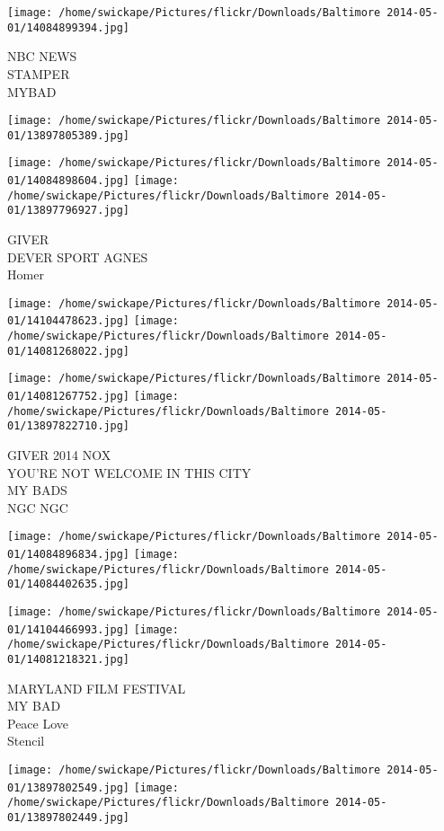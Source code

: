 \documentclass[10pt,letterpaper]{article}
\begin{document}
\texttt{[image: /home/swickape/Pictures/flickr/Downloads/Baltimore 2014-05-01/14084899394.jpg]}

NBC NEWS\\
STAMPER\\
MYBAD
\pagebreak

\texttt{[image: /home/swickape/Pictures/flickr/Downloads/Baltimore 2014-05-01/13897805389.jpg]}

\vspace{0.25in}
\texttt{[image: /home/swickape/Pictures/flickr/Downloads/Baltimore 2014-05-01/14084898604.jpg]}
\texttt{[image: /home/swickape/Pictures/flickr/Downloads/Baltimore 2014-05-01/13897796927.jpg]}

GIVER\\
DEVER SPORT AGNES\\
Homer
\pagebreak

\texttt{[image: /home/swickape/Pictures/flickr/Downloads/Baltimore 2014-05-01/14104478623.jpg]}
\texttt{[image: /home/swickape/Pictures/flickr/Downloads/Baltimore 2014-05-01/14081268022.jpg]}

\texttt{[image: /home/swickape/Pictures/flickr/Downloads/Baltimore 2014-05-01/14081267752.jpg]}
\texttt{[image: /home/swickape/Pictures/flickr/Downloads/Baltimore 2014-05-01/13897822710.jpg]}

GIVER 2014 NOX\\
YOU'RE NOT WELCOME IN THIS CITY\\
MY BADS\\
NGC NGC
\pagebreak

\texttt{[image: /home/swickape/Pictures/flickr/Downloads/Baltimore 2014-05-01/14084896834.jpg]}
\texttt{[image: /home/swickape/Pictures/flickr/Downloads/Baltimore 2014-05-01/14084402635.jpg]}

\texttt{[image: /home/swickape/Pictures/flickr/Downloads/Baltimore 2014-05-01/14104466993.jpg]}
\texttt{[image: /home/swickape/Pictures/flickr/Downloads/Baltimore 2014-05-01/14081218321.jpg]}

MARYLAND FILM FESTIVAL\\
MY BAD\\
Peace Love\\
Stencil
\pagebreak

\texttt{[image: /home/swickape/Pictures/flickr/Downloads/Baltimore 2014-05-01/13897802549.jpg]}
\texttt{[image: /home/swickape/Pictures/flickr/Downloads/Baltimore 2014-05-01/13897802449.jpg]}
\end{document}
